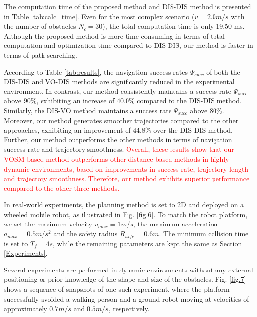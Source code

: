 \documentclass[preprint,5p,times,twocolumn,authoryear]{elsarticle}
\begin{document}
The computation time of the proposed method and DIS-DIS method is presented in Table \ref{tab:calc_time}. Even for the most complex scenario ($v=2.0m/s$ with the number of obstacles $N_c=30$), the total computation time is only 19.50 ms. Although the proposed method is more time-consuming in terms of total computation and optimization time compared to DIS-DIS, our method is faster in terms of path searching.

According to Table \ref{tab:results}, the navigation success rates $\Psi_{succ}$ of both the DIS-DIS and VO-DIS methods are significantly reduced in the experimental environment. In contrast, our method consistently maintains a success rate $\Psi_{succ}$ above $90\%$, exhibiting an increase of $40.0\%$ compared to the DIS-DIS method. Similarly, the DIS-VO method maintains a success rate $\Psi_{succ}$ above $80\%$. Moreover, our method generates smoother trajectories compared to the other approaches, exhibiting an improvement of $44.8\%$ over the DIS-DIS method. Further, our method outperforms the other methods in terms of navigation success rate and trajectory smoothness. \textcolor{red}{Overall, these results show that our VOSM-based method outperforms other distance-based methods in highly dynamic environments, based on improvements in success rate, trajectory length and trajectory smoothness. Therefore, our method exhibits superior performance compared to the other three methods.}


In real-world experiments, the planning method is set to 2D and deployed on a wheeled mobile robot, as illustrated in Fig. \ref{fig.6}. To match the robot platform, we set the maximum velocity $v_{max}=1m/s$, the maximum acceleration $a_{max}=0.5m/s^2$ and the safety radius $R_{safe}=0.6m$. The minimum collision time is set to $T_f=4s$, while the remaining parameters are kept the same as Section \ref{Experiments}.

Several experiments are performed in dynamic environments without any external positioning or prior knowledge of the shape and size of the obstacles. Fig. \ref{fig.7} shows a sequence of snapshots of one such experiment, where the platform successfully avoided a walking person and a ground robot moving at velocities of approximately $0.7m/s$ and $0.5m/s$, respectively.
\end{document}

